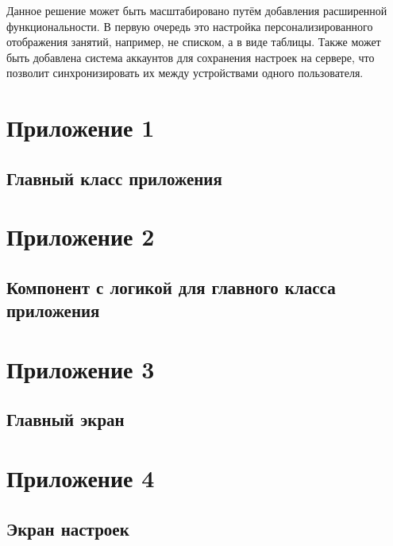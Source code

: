 \documentclass{vsureport}
\begin{document}
Данное решение может быть масштабировано путём добавления расширенной функциональности. В первую очередь это настройка персонализированного отображения занятий, например, не списком, а в виде таблицы. Также может быть добавлена система аккаунтов для сохранения настроек на сервере, что позволит синхронизировать их между устройствами одного пользователя.

\renewcommand{\refname}{Список используемых источников}


\newpage
{} %

\section*{Приложение 1}
\subsection*{Главный класс приложения}


\newpage
\section*{Приложение 2}
\subsection*{Компонент с логикой для главного класса приложения}


\newpage
\section*{Приложение 3}
\subsection*{Главный экран}


\newpage
\section*{Приложение 4}
\subsection*{Экран настроек}

\end{document}
